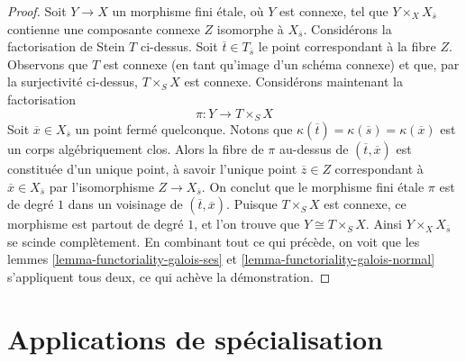 \begin{proof}
\medskip\noindent
Soit $Y \to X$ un morphisme fini \'etale, où $Y$ est connexe, tel que
$Y \times_X X_{\overline{s}}$ contienne une composante connexe $Z$
isomorphe à $X_{\overline{s}}$. Considérons la factorisation de Stein $T$
ci-dessus. Soit $\overline{t} \in T_{\overline{s}}$ le point correspondant
à la fibre $Z$. Observons que $T$ est connexe (en tant qu'image d'un schéma
connexe) et que, par la surjectivité ci-dessus, $T \times_S X$ est connexe.
Considérons maintenant la factorisation
$$
\pi : Y \longrightarrow T \times_S X
$$
Soit $\overline{x} \in X_{\overline{s}}$ un point fermé quelconque. Notons que
$\kappa(\overline{t}) = \kappa(\overline{s}) = \kappa(\overline{x})$
est un corps algébriquement clos.
Alors la fibre de $\pi$ au-dessus de $(\overline{t}, \overline{x})$ est constituée
d'un unique point, à savoir l'unique point $\overline{z} \in Z$
correspondant à $\overline{x} \in X_{\overline{s}}$ par
l'isomorphisme $Z \to X_{\overline{s}}$. On conclut que le morphisme fini
\'etale $\pi$ est de degré $1$ dans un voisinage de
$(\overline{t}, \overline{x})$. Puisque $T \times_S X$ est connexe,
ce morphisme est partout de degré $1$, et l'on trouve que $Y \cong T \times_S X$.
Ainsi $Y \times_X X_{\overline{s}}$ se scinde complètement.
En combinant tout ce qui précède, on voit que les
lemmes \ref{lemma-functoriality-galois-ses} et
\ref{lemma-functoriality-galois-normal}
s'appliquent tous deux, ce qui achève la démonstration.
\end{proof}




\section{Applications de spécialisation}
\label{section-specialization-map}


